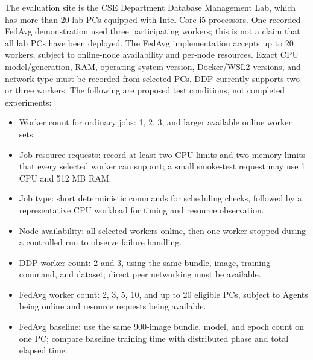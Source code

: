 \documentclass{article}
\begin{document}
The evaluation site is the CSE Department Database Management Lab, which has more than 20 lab PCs equipped with Intel Core i5 processors. One recorded FedAvg demonstration used three participating workers; this is not a claim that all lab PCs have been deployed. The FedAvg implementation accepts up to 20 workers, subject to online-node availability and per-node resources. Exact CPU model/generation, RAM, operating-system version, Docker/WSL2 versions, and network type must be recorded from selected PCs. DDP currently supports two or three workers. The following are proposed test conditions, not completed experiments:
\begin{itemize}
  \item Worker count for ordinary jobs: 1, 2, 3, and larger available online worker sets.
  \item Job resource requests: record at least two CPU limits and two memory limits that every selected worker can support; a small smoke-test request may use 1 CPU and 512 MB RAM.
  \item Job type: short deterministic commands for scheduling checks, followed by a representative CPU workload for timing and resource observation.
  \item Node availability: all selected workers online, then one worker stopped during a controlled run to observe failure handling.
  \item DDP worker count: 2 and 3, using the same bundle, image, training command, and dataset; direct peer networking must be available.
  \item FedAvg worker count: 2, 3, 5, 10, and up to 20 eligible PCs, subject to Agents being online and resource requests being available.
  \item FedAvg baseline: use the same 900-image bundle, model, and epoch count on one PC; compare baseline training time with distributed phase and total elapsed time.
\end{itemize}
\end{document}
